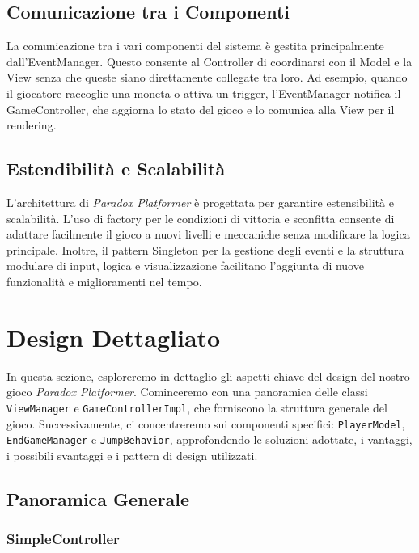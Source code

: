 \documentclass[a4paper,12pt]{report}
\begin{document}
	\subsection{Comunicazione tra i Componenti}
	
	La comunicazione tra i vari componenti del sistema è gestita principalmente dall'EventManager. Questo consente al Controller di coordinarsi con il Model e la View senza che queste siano direttamente collegate tra loro. Ad esempio, quando il giocatore raccoglie una moneta o attiva un trigger, l'EventManager notifica il GameController, che aggiorna lo stato del gioco e lo comunica alla View per il rendering.
	
	\subsection{Estendibilità e Scalabilità}
	
	L'architettura di \textit{Paradox Platformer} è progettata per garantire estensibilità e scalabilità. L’uso di factory per le condizioni di vittoria e sconfitta consente di adattare facilmente il gioco a nuovi livelli e meccaniche senza modificare la logica principale. Inoltre, il pattern Singleton per la gestione degli eventi e la struttura modulare di input, logica e visualizzazione facilitano l'aggiunta di nuove funzionalità e miglioramenti nel tempo.
	
	
	\section{Design Dettagliato}
	
	In questa sezione, esploreremo in dettaglio gli aspetti chiave del design del nostro gioco \textit{Paradox Platformer}. Cominceremo con una panoramica delle classi \texttt{ViewManager} e \texttt{GameControllerImpl}, che forniscono la struttura generale del gioco. Successivamente, ci concentreremo sui componenti specifici: \texttt{PlayerModel}, \texttt{EndGameManager} e \texttt{JumpBehavior}, approfondendo le soluzioni adottate, i vantaggi, i possibili svantaggi e i pattern di design utilizzati.
	
	\subsection{Panoramica Generale}
	
	\subsubsection{SimpleController}
	
\end{document}

